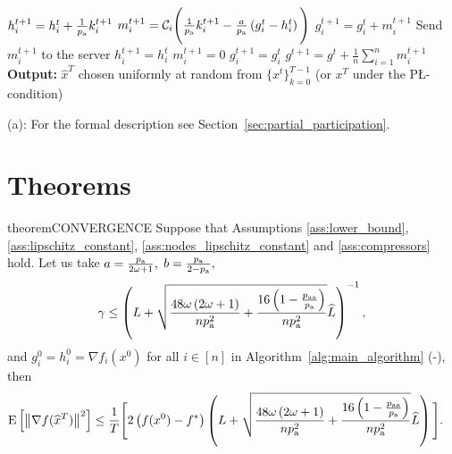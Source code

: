 \documentclass{article}
\newcommand*{\probavailable}{\ensuremath{p_{\textnormal{a}}}}
\newcommand*{\probpairaa}{\ensuremath{p_{\textnormal{aa}}}}
\begin{document}
\begin{minipage}{\textwidth}
\begin{algorithm}[H]
\begin{algorithmic}[1]
      \STATE $h^{t+1}_i = h^t_i + \frac{1}{\probavailable}k^{t+1}_i$ 
      \STATE $m^{t+1}_i = \cC_i\Bigg(\frac{1}{\probavailable}k^{t+1}_i - \frac{a}{\probavailable} \left(g^{t}_i - h^{t}_i\right)\Bigg)$
      \STATE $g^{t+1}_i = g^{t}_i + m^{t+1}_i$
      \STATE Send $m^{t+1}_i$ to the server
  \ELSE
      \STATE $h^{t+1}_i = h^{t}_i$
      \STATE $m^{t+1}_i = 0$
      \STATE $g^{t+1}_i = g^{t}_i$
  \ENDIF
  \ENDFOR
  \STATE $g^{t+1} = g^t + \frac{1}{n} \sum_{i=1}^n m^{t+1}_i$
  \ENDFOR
  \STATE \textbf{Output:} $\hat{x}^T$ chosen uniformly at random from $\{x^t\}_{k=0}^{T-1}$ (or $x^T$ under the P\L-condition)
  \end{algorithmic}
\end{algorithm}
{\red (a)}: For the formal description see Section~\ref{sec:partial_participation}.
\end{minipage}

\section{Theorems}

\begin{restatable}{theorem}{CONVERGENCE}
  \label{theorem:gradient_oracle}
  Suppose that Assumptions \ref{ass:lower_bound}, \ref{ass:lipschitz_constant}, \ref{ass:nodes_lipschitz_constant} and \ref{ass:compressors} hold. Let us take $a = \frac{\probavailable}{2 \omega + 1} ,$ $b = \frac{\probavailable}{2 - \probavailable},$ $$\gamma \leq \left(L + \sqrt{\frac{48 \omega \left(2 \omega + 1\right)}{n \probavailable^2} + \frac{16 \left(1 - \frac{\probpairaa}{\probavailable}\right)}{n \probavailable^2}} \widehat{L}\right)^{-1},$$ and $g^{0}_i = h^{0}_i = \nabla f_i(x^0)$ for all $i \in [n]$
  in Algorithm~\ref{alg:main_algorithm} (-), then
  \begin{align*}
      &\Exp{\norm{\nabla f(\widehat{x}^T)}^2} \leq \frac{1}{T}\Bigg[2 \left(f(x^0) - f^*\right)\left(L + \sqrt{\frac{48 \omega \left(2 \omega + 1\right)}{n \probavailable^2} + \frac{16 \left(1 - \frac{\probpairaa}{\probavailable}\right)}{n \probavailable^2}} \widehat{L}\right)\Bigg].
  \end{align*}
\end{restatable}

\newpage
\appendix
\end{document}
